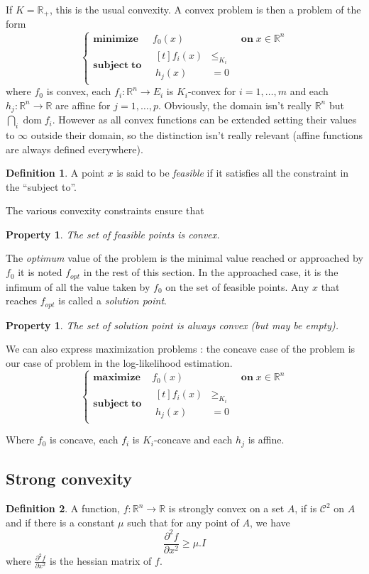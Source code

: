 \documentclass[10pt,a4paper]{report}
\theoremstyle{plain}
\newtheorem{prop}[thm]{Property}
\theoremstyle{definition}
\newtheorem{defn}{Definition}[chapter]
\theoremstyle{remark}
\newcommand{\R}{\ensuremath{\mathbb{R}}}
\newcommand{\dparn}[3]{\frac{\partial^{#3} {#1}}{\partial{#2}^{#3}}}
\renewcommand{\geq}{\geqslant}
\renewcommand{\leq}{\leqslant}
\DeclareMathOperator{\dom}{dom}
\newcommand{\class}[1]{{\mathscr{C}^{#1}}}
\newcommand{\maxima}[3]{\begin{cases}
    \mathbf{maximize}\,\quad #1& \mathbf{on}\; #2\\
    \mathbf{subject\;to}\quad \begin{aligned}[t]#3\end{aligned}
  \end{cases}}
\newcommand{\minima}[3]{\begin{cases}
    \mathbf{minimize}\;\,\quad #1& \mathbf{on}\; #2\\
    \mathbf{subject\;to}\quad \begin{aligned}[t]#3\end{aligned}
  \end{cases}}
\begin{document}
If $K = \R_+$, this is the usual convexity. A convex problem is then a problem
of the form
\begin{equation}\label{eqn:stdprb}
\minima{f_0(x)}{x \in \R^n}{f_i(x) &\leq_{K_i} \\ \!\!h_j(x) &= 0}
\end{equation}
where $f_0$ is convex, each $f_i : \R^n \to E_i$ is $K_i$-convex for $i = 1,\ldots,m$ and each
$h_j : \R^n \to \R$ are affine for $j = 1,\ldots,p$. Obviously, the domain isn't really $\R^n$
but $\bigcap_i \dom f_i$. However as all convex
functions can be extended setting their values to $\infty$ outside their domain,
so the distinction isn't really relevant (affine functions are always defined
everywhere).

\begin{defn}
  A point $x$ is said to be \emph{feasible} if it satisfies all the constraint
  in the ``subject to''.
\end{defn}

The various convexity constraints ensure that

\begin{prop}
  The set of feasible points is convex.
\end{prop}

The \emph{optimum} value of the problem is the minimal value reached or approached by $f_0$ it
is noted $f_{opt}$ in the rest of this section. In the approached case, it is the
infimum of all the value taken by $f_0$ on the set of feasible points.
Any $x$ that reaches $f_{opt}$ is called a \emph{solution point}.

\begin{prop}
  The set of solution point is always convex (but may be empty).
\end{prop}

We can also express maximization problems : the concave case of the problem is
our case of problem in the log-likelihood estimation.
\[\maxima{f_0(x)}{x \in \R^n}{f_i(x) &\geq_{K_i}\\\!h_j(x)&=0}\]

Where $f_0$ is concave, each $f_i$ is $K_i$-concave and each $h_j$ is affine.

\subsection{Strong convexity}

\begin{defn}
  A function, $f : \R^n \to \R$ is strongly convex on a set $A$, if is $\class
  2$ on $A$ and if there is a constant $\mu$ such that
  for any point of $A$, we have
  \[\dparn f x 2 \geq \mu.I\]
  where $\dparn f x 2$ is the hessian matrix of $f$.
\end{defn}
\end{document}
